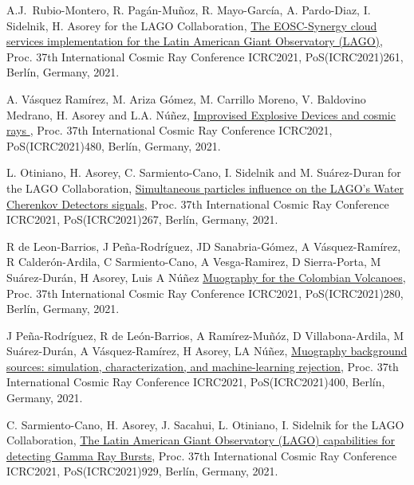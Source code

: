 \begin{etaremune}
\item {} A.J.\ Rubio-Montero, R. Pagán-Muñoz, R. Mayo-García, A. Pardo-Diaz, I. Sidelnik, H. Asorey for the LAGO Collaboration, \href{https://doi.org/10.22323/1.395.0261}{The EOSC-Synergy cloud services implementation for the Latin American Giant Observatory (LAGO)}, \en Proc.
37th International Cosmic Ray Conference ICRC2021, PoS(ICRC2021)261, Berlín, Germany, 2021.

\item {} A. Vásquez Ramírez, M. Ariza Gómez, M. Carrillo Moreno, V. Baldovino Medrano, H. Asorey and L.A. Núñez, \href{https://doi.org/10.22323/1.395.0480}{Improvised Explosive Devices and cosmic rays
}, \en Proc. 37th International Cosmic Ray Conference ICRC2021, PoS(ICRC2021)480, Berlín, Germany, 2021.

\item {} L. Otiniano, H. Asorey, C. Sarmiento-Cano, I. Sidelnik and M. Suárez-Duran for the LAGO Collaboration, \href{https://doi.org/10.22323/1.395.0267}{Simultaneous particles influence on the LAGO’s Water Cherenkov Detectors signals}, \en Proc.
37th International Cosmic Ray Conference ICRC2021, PoS(ICRC2021)267, Berlín, Germany, 2021.

\item {} R de Leon-Barrios, J Peña-Rodríguez, JD Sanabria-Gómez, A Vásquez-Ramírez, R Calderón-Ardila, C Sarmiento-Cano, A Vesga-Ramirez, D Sierra-Porta, M Suárez-Durán, H Asorey, Luis A Núñez \href{https://doi.org/10.22323/1.395.0280}{Muography for the Colombian Volcanoes}, \en Proc.
37th International Cosmic Ray Conference ICRC2021, PoS(ICRC2021)280, Berlín, Germany, 2021.

\item {} J Peña-Rodríguez, R de León-Barrios, A Ramírez-Muñóz, D Villabona-Ardila, M Suárez-Durán, A Vásquez-Ramírez, H Asorey, LA Núñez, \href{https://doi.org/10.22323/1.395.0400}{Muography background sources: simulation, characterization, and machine-learning rejection}, \en Proc.
37th International Cosmic Ray Conference ICRC2021, PoS(ICRC2021)400, Berlín, Germany, 2021.

\item {} C. Sarmiento-Cano, H. Asorey, J. Sacahui, L. Otiniano, I. Sidelnik for the LAGO Collaboration, \href{https://doi.org/10.22323/1.395.0929}{The Latin American Giant Observatory (LAGO) capabilities for detecting Gamma Ray Bursts}, \en Proc.
37th International Cosmic Ray Conference ICRC2021, PoS(ICRC2021)929, Berlín, Germany, 2021.


\end{etaremune}
